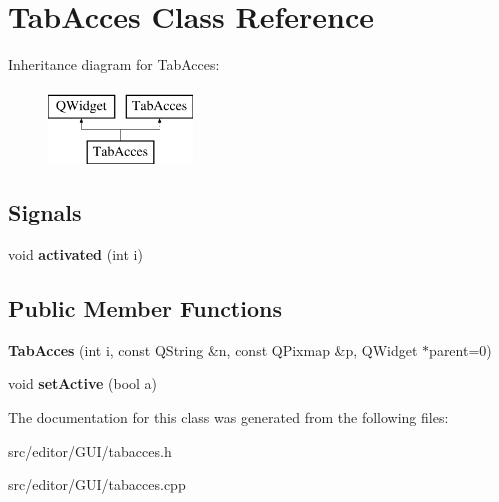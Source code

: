 \hypertarget{class_tab_acces}{}\section{Tab\+Acces Class Reference}
\label{class_tab_acces}
Inheritance diagram for Tab\+Acces\+:\begin{figure}[H]
\begin{center}
\leavevmode
\includegraphics[height=2.000000cm]{class_tab_acces}
\end{center}
\end{figure}
\subsection*{Signals}
\begin{DoxyCompactItemize}
\item 
\hypertarget{class_tab_acces_a3a44992ceb2227664fce84ed26ae226c}{}\label{class_tab_acces_a3a44992ceb2227664fce84ed26ae226c} 
void {\bfseries activated} (int i)
\end{DoxyCompactItemize}
\subsection*{Public Member Functions}
\begin{DoxyCompactItemize}
\item 
\hypertarget{class_tab_acces_a0e6bcf25a31952e09517ce2273f81786}{}\label{class_tab_acces_a0e6bcf25a31952e09517ce2273f81786} 
{\bfseries Tab\+Acces} (int i, const Q\+String \&n, const Q\+Pixmap \&p, Q\+Widget $\ast$parent=0)
\item 
\hypertarget{class_tab_acces_a2b5298cbcbd0e7e880d7418dea03aa53}{}\label{class_tab_acces_a2b5298cbcbd0e7e880d7418dea03aa53} 
void {\bfseries set\+Active} (bool a)
\end{DoxyCompactItemize}


The documentation for this class was generated from the following files\+:\begin{DoxyCompactItemize}
\item 
src/editor/\+G\+U\+I/tabacces.\+h\item 
src/editor/\+G\+U\+I/tabacces.\+cpp\end{DoxyCompactItemize}
